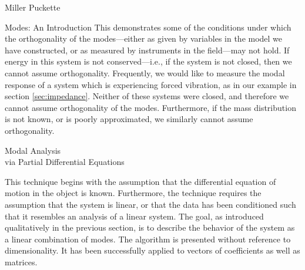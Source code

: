 \documentclass[a4paper,10pt]{report}
\numberwithin{equation}{section}
\begin{document}
\begin{chapter}{Miller Puckette}
\begin{section}{Modes: An Introduction}
This demonstrates some of the conditions under which the orthogonality of the modes---either as given by variables in the model we have constructed, or as measured by instruments in the field---may not hold. If energy in this system is not conserved---i.e., if the system is not closed, then we cannot assume orthogonality. Frequently, we would like to measure the modal response of a system which is experiencing forced vibration, as in our example in section \ref{sec:impedance}. Neither of these systems were closed, and therefore we cannot assume orthogonality of the modes. Furthermore, if the mass distribution is not known, or is poorly approximated, we similarly cannot assume orthogonality. 
\end{section}

\begin{section}{Modal Analysis \\via Partial Differential Equations}\label{sec:PDEmodes}

This technique begins with the assumption that the differential equation of motion in the object is known. Furthermore, the technique requires the assumption that the system is linear, or that the data has been conditioned such that it resembles an analysis of a linear system. The goal, as introduced qualitatively in the previous section, is to describe the behavior of the system as a linear combination of modes. The algorithm is presented without reference to dimensionality. It has been successfully applied to vectors of coefficients as well as matrices. \cite[p.~317]{Strang2009}


\end{section}
\end{chapter}
\end{document}
